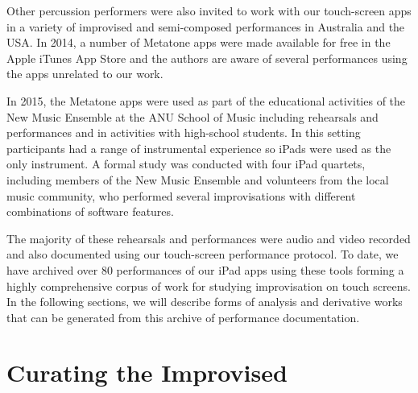 \documentclass[graybox]{svmult}
\begin{document}
Other percussion performers were also invited to work with our
touch-screen apps in a variety of improvised and semi-composed
performances in Australia and the USA. In 2014, a number of Metatone
apps were made available for free in the Apple iTunes App Store and
the authors are aware of several performances using the apps unrelated
to our work.

In 2015, the Metatone apps were used as part of the educational
activities of the New Music Ensemble at the ANU School of Music
including rehearsals and performances and in activities with
high-school students. In this setting participants had a range of
instrumental experience so iPads were used as the only instrument. A
formal study was conducted with four iPad quartets, including members
of the New Music Ensemble and volunteers from the local music
community, who performed several improvisations with different
combinations of software features.

The majority of these rehearsals and performances were audio and video
recorded and also documented using our touch-screen performance
protocol. To date, we have archived over 80 performances of our iPad
apps using these tools forming a highly comprehensive corpus of work
for studying improvisation on touch screens. In the following
sections, we will describe forms of analysis and derivative works that
can be generated from this archive of performance documentation.



\section{Curating the Improvised}
\end{document}
